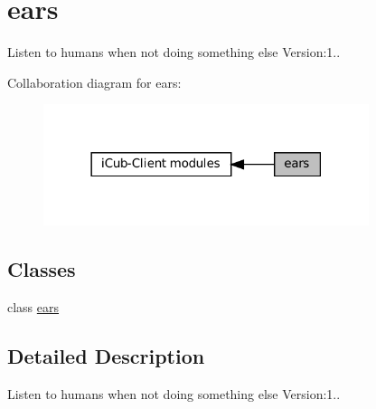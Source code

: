 \hypertarget{group__ears}{}\section{ears}
\label{group__ears}


Listen to humans when not doing something else Version\+:1..  


Collaboration diagram for ears\+:
\nopagebreak
\begin{figure}[H]
\begin{center}
\leavevmode
\includegraphics[width=270pt]{group__ears}
\end{center}
\end{figure}
\subsection*{Classes}
\begin{DoxyCompactItemize}
\item 
class \hyperlink{group__ears_classears}{ears}
\end{DoxyCompactItemize}


\subsection{Detailed Description}
Listen to humans when not doing something else Version\+:1.. 

